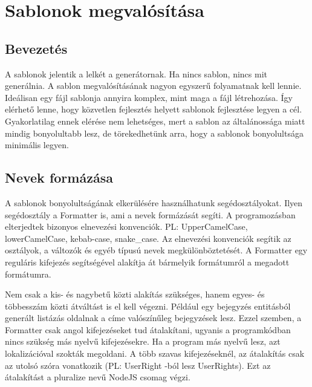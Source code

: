 \documentclass[a4paper,12pt,oneside]{report}
\begin{document}
\newpage
\section{Sablonok megvalósítása}
\subsection{Bevezetés}

\begin{justify}

	A sablonok jelentik a lelkét a generátornak. Ha nincs sablon, nincs mit generálnia. A sablon megvalósításának nagyon egyszerű folyamatnak kell lennie. Ideálisan egy fájl sablonja annyira komplex, mint maga a fájl létrehozása. Így elérhető lenne, hogy közvetlen fejlesztés helyett sablonok fejlesztése legyen a cél. Gyakorlatilag ennek elérése nem lehetséges, mert a sablon az általánossága miatt mindig bonyolultabb lesz, de törekedhetünk arra, hogy a sablonok bonyolultsága minimális legyen. 

\end{justify}

\newpage
\subsection{Nevek formázása}

\begin{justify}

	A sablonok bonyolultságának elkerülésére használhatunk segédosztályokat. Ilyen segédosztály a Formatter is, ami a nevek formázását segíti. A programozásban elterjedtek bizonyos elnevezési konvenciók. PL: UpperCamelCase, lowerCamelCase, kebab-case, snake\_case. Az elnevezési konvenciók segítik az osztályok, a változók és egyéb típusú nevek megkülönböztetését. A Formatter egy reguláris kifejezés segítségével alakítja át bármelyik formátumról a megadott formátumra. 

	Nem csak a kis- és nagybetű közti alakítás szükséges, hanem egyes- és többesszám közti átváltást is el kell végezni. Például egy bejegyzés entitásból generált listázás oldalnak a címe valószínűleg bejegyzések lesz. Ezzel szemben, a Formatter csak angol kifejezéseket tud átalakítani, ugyanis a programkódban nincs szükség más nyelvű kifejezésekre. Ha a program más nyelvű lesz, azt lokalizációval szokták megoldani. A több szavas kifejezéseknél, az átalakítás csak az utolsó szóra vonatkozik (PL: UserRight -ból lesz UserRights). Ezt az átalakítást a pluralize nevű NodeJS csomag végzi.

\end{justify}
\end{document}
